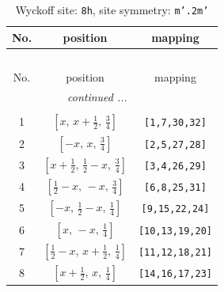 \documentclass[fleqn,8pt]{jsarticle}
\begin{document}
\begin{longtable}{ccc}
\caption{Wyckoff site: {\tt 8h}, site symmetry: {\tt m'.2m'}}
 \\
 \hline \hline
No. & position & mapping \\ \hline \endfirsthead

\multicolumn{2}{l}{\tablename\ \thetable{}} \\
 \hline \hline
No. & position & mapping \\ \hline \endhead

 \hline \hline
\multicolumn{2}{r}{\footnotesize\it continued ...} \\ \endfoot

 \hline \hline
\multicolumn{2}{r}{} \\ \endlastfoot

1 & $\left[ x,\, x + \frac{1}{2},\, \frac{3}{4} \right]$ & {\tt [1,7,30,32]} \\ \hline
2 & $\left[ - x,\, x,\, \frac{3}{4} \right]$ & {\tt [2,5,27,28]} \\ \hline
3 & $\left[ x + \frac{1}{2},\, \frac{1}{2} - x,\, \frac{3}{4} \right]$ & {\tt [3,4,26,29]} \\ \hline
4 & $\left[ \frac{1}{2} - x,\, - x,\, \frac{3}{4} \right]$ & {\tt [6,8,25,31]} \\ \hline
5 & $\left[ - x,\, \frac{1}{2} - x,\, \frac{1}{4} \right]$ & {\tt [9,15,22,24]} \\ \hline
6 & $\left[ x,\, - x,\, \frac{1}{4} \right]$ & {\tt [10,13,19,20]} \\ \hline
7 & $\left[ \frac{1}{2} - x,\, x + \frac{1}{2},\, \frac{1}{4} \right]$ & {\tt [11,12,18,21]} \\ \hline
8 & $\left[ x + \frac{1}{2},\, x,\, \frac{1}{4} \right]$ & {\tt [14,16,17,23]} \\
\end{longtable}
\renewcommand{\arraystretch}{1.2}
\end{document}
